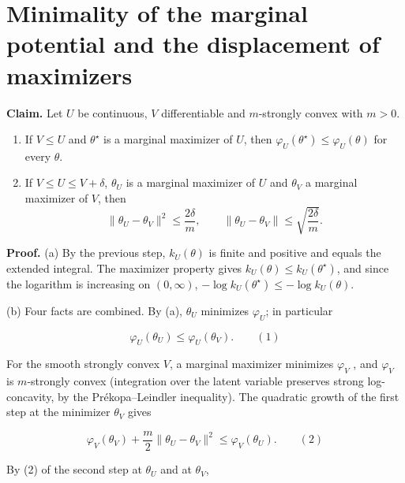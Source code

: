 \documentclass[11pt,a4paper]{article}
\begin{document}
\section{\texorpdfstring{Minimality of the marginal potential and the displacement of maximizers}{Minimality of the marginal potential and the displacement of maximizers}}


\textbf{Claim.} Let \(U\) be continuous, \(V\) differentiable and \(m\)-strongly convex with \(m>0\).



\begin{enumerate}


\item If \(V\le U\) and \(\theta^\star\) is a marginal maximizer of \(U\), then \(\varphi_U(\theta^\star)\le\varphi_U(\theta)\) for every \(\theta\).

\item If \(V\le U\le V+\delta\), \(\theta_U\) is a marginal maximizer of \(U\) and \(\theta_V\) a marginal maximizer of \(V\), then
\[\|\theta_U-\theta_V\|^2\le\frac{2\delta}m,\qquad\|\theta_U-\theta_V\|\le\sqrt{\frac{2\delta}m}.\]

\end{enumerate}



\textbf{Proof.} (a) By the previous step, \(k_U(\theta)\) is finite and positive and equals the extended integral. The maximizer property gives \(k_U(\theta)\le k_U(\theta^\star)\), and since the logarithm is increasing on \((0,\infty)\), \(-\log k_U(\theta^\star)\le-\log k_U(\theta)\).




(b) Four facts are combined. By (a), \(\theta_U\) minimizes \(\varphi_U\); in particular


\[\varphi_U(\theta_U)\le\varphi_U(\theta_V).\qquad(1)\]


For the smooth strongly convex \(V\), a marginal maximizer minimizes \(\varphi_V\) \cite[Section~3.12.1]{LangevinLean2026IPLA}, and \(\varphi_V\) is \(m\)-strongly convex \cite[Section~3.12.3]{LangevinLean2026IPLA} (integration over the latent variable preserves strong log-concavity, by the Prékopa–Leindler inequality). The quadratic growth of the first step at the minimizer \(\theta_V\) gives


\[\varphi_V(\theta_V)+\frac m2\|\theta_U-\theta_V\|^2\le\varphi_V(\theta_U).\qquad(2)\]


By (2) of the second step at \(\theta_U\) and at \(\theta_V\),
\end{document}

